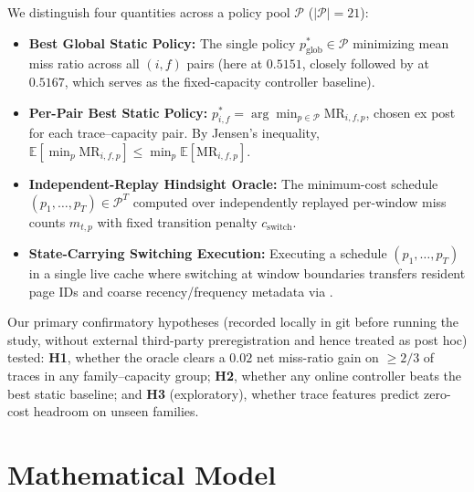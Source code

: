 \documentclass[10pt,twocolumn]{article}
\newcommand{\code}[1]{\path{#1}}
\begin{document}
We distinguish four quantities across a policy pool $\mathcal{P}$ ($|\mathcal{P}|=21$):
\begin{itemize}
\item \textbf{Best Global Static Policy:} The single policy $p_{\text{glob}}^* \in \mathcal{P}$ minimizing mean miss ratio across all $(i, f)$ pairs (here \code{CAR} at $0.5151$, closely followed by \code{S3-FIFO} at $0.5167$, which serves as the fixed-capacity controller baseline).
\item \textbf{Per-Pair Best Static Policy:} $p_{i,f}^* = \arg\min_{p \in \mathcal{P}} \text{MR}_{i,f,p}$, chosen ex post for each trace--capacity pair. By Jensen's inequality, $\mathbb{E}[\min_p \text{MR}_{i,f,p}] \le \min_p \mathbb{E}[\text{MR}_{i,f,p}]$.
\item \textbf{Independent-Replay Hindsight Oracle:} The minimum-cost schedule $(p_1,\dots,p_T) \in \mathcal{P}^T$ computed over independently replayed per-window miss counts $m_{t,p}$ with fixed transition penalty $c_{\text{switch}}$.
\item \textbf{State-Carrying Switching Execution:} Executing a schedule $(p_1,\dots,p_T)$ in a single live cache where switching at window boundaries transfers resident page IDs and coarse recency/frequency metadata via \code{switchTo()}.
\end{itemize}

Our primary confirmatory hypotheses (recorded locally in git before running the study, without external third-party preregistration and hence treated as post hoc) tested: \textbf{H1}, whether the oracle clears a $0.02$ net miss-ratio gain on $\ge 2/3$ of traces in any family--capacity group; \textbf{H2}, whether any online controller beats the best static baseline; and \textbf{H3} (exploratory), whether trace features predict zero-cost headroom on unseen families.

\section{Mathematical Model}
\label{sec:model}
\end{document}

